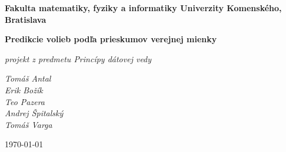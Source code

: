 \documentclass[12pt,oneside,a4paper,slovak]{article}
\begin{document}
	\setcounter{section}{0}
	\begin{titlepage}
		\large
		
		\begin{center}
			\textbf{Fakulta matematiky, fyziky a informatiky Univerzity Komenského, Bratislava}
			
			\vspace{7.5cm}
			
			\LARGE\textbf{ Predikcie volieb podľa prieskumov verejnej mienky }
			
			\vspace{1cm}
			
			\large\textit{projekt z predmetu Princípy dátovej vedy}
			
			\bigskip 
		\end{center}
			
		\vfill
		
		\begin{minipage}{0.5\textwidth}
			\raggedright
			
			\textit{Tomáš Antal\\Erik Božík\\Teo Pazera\\Andrej Špitalský\\Tomáš Varga}
		\end{minipage}
		\hfil
		\begin{minipage}{0.5\textwidth}
			\raggedleft
			\vspace{2.6cm}
			\today
		\end{minipage}
			
	\end{titlepage}
	
	\tableofcontents
	\newpage
	
	
	\newpage
	
	\newpage
	
	\newpage
	
	\newpage
	
	\newpage
	
	\newpage
	
	
\end{document}
